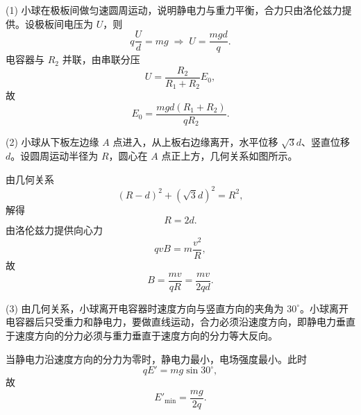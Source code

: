 \begin{answer}
(1) 小球在极板间做匀速圆周运动，说明静电力与重力平衡，合力只由洛伦兹力提供。设极板间电压为 $U$，则
\[
  q\frac{U}{d}=mg
  \;\Longrightarrow\;
  U=\frac{mgd}{q}.
\]
电容器与 $R_{2}$ 并联，由串联分压
\[
  U=\frac{R_{2}}{R_{1}+R_{2}}E_{0},
\]
故
\[
  E_{0}=\frac{mgd(R_{1}+R_{2})}{qR_{2}}.
\]

(2) 小球从下板左边缘 $A$ 点进入，从上板右边缘离开，水平位移 $\sqrt{3}d$、竖直位移 $d$。设圆周运动半径为 $R$，圆心在 $A$ 点正上方，几何关系如图所示。


由几何关系
\[
  (R-d)^{2}+(\sqrt{3}d)^{2}=R^{2},
\]
解得
\[
  R=2d .
\]
由洛伦兹力提供向心力
\[
  qvB=m\frac{v^{2}}{R},
\]
故
\[
  B=\frac{mv}{qR}=\frac{mv}{2qd}.
\]

(3) 由几何关系，小球离开电容器时速度方向与竖直方向的夹角为 $30^{\circ}$。小球离开电容器后只受重力和静电力，要做直线运动，合力必须沿速度方向，即静电力垂直于速度方向的分力必须与重力垂直于速度方向的分力等大反向。

当静电力沿速度方向的分力为零时，静电力最小，电场强度最小。此时
\[
  qE'=mg\sin30^{\circ},
\]
故
\[
  E'_{\min}=\frac{mg}{2q}.
\]
\end{answer}


